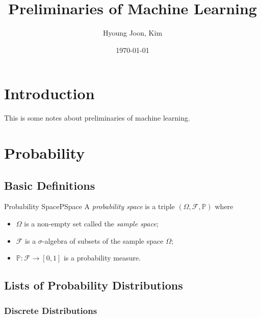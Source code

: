 \documentclass{article}
\title{Preliminaries of Machine Learning}
\author{Hyoung Joon, Kim}
\date{\today}
\begin{document}
\maketitle
\tableofcontents
\newpage

\section{Introduction}

This is some notes about preliminaries of machine learning.

\section{Probability}
\subsection{Basic Definitions}

\begin{defn}{Probability Space}{PSpace}
    A \emph{probability space} is a triple \(( \Omega, \mathcal{F}, \mathbb{P})\) where
    \begin{itemize}
        \item \(\Omega\) is a non-empty set called the \emph{sample space};
        \item \(\mathcal{F}\) is a \(\sigma\)-algebra of subsets of the sample space \(\Omega\);
        \item \(\mathbb{P} :\mathcal{F} \to [0, 1]\) is a probability measure.
    \end{itemize}
\end{defn}

\subsection{Lists of Probability Distributions}

\subsubsection{Discrete Distributions}
\end{document}
